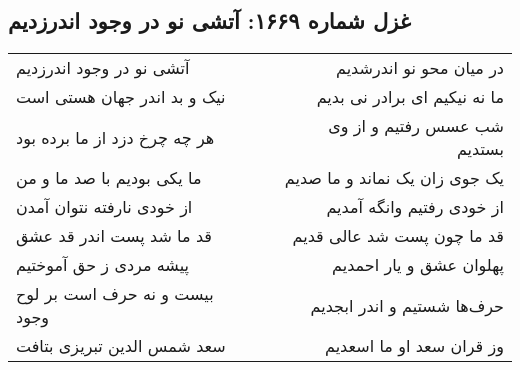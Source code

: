 \begin{center}
\section*{غزل شماره ۱۶۶۹: آتشی نو در وجود اندرزدیم}
\label{sec:1669}
\begin{longtable}{l p{0.5cm} r}
آتشی نو در وجود اندرزدیم
&&
در میان محو نو اندرشدیم
\\
نیک و بد اندر جهان هستی است
&&
ما نه نیکیم ای برادر نی بدیم
\\
هر چه چرخ دزد از ما برده بود
&&
شب عسس رفتیم و از وی بستدیم
\\
ما یکی بودیم با صد ما و من
&&
یک جوی زان یک نماند و ما صدیم
\\
از خودی نارفته نتوان آمدن
&&
از خودی رفتیم وانگه آمدیم
\\
قد ما شد پست اندر قد عشق
&&
قد ما چون پست شد عالی قدیم
\\
پیشه مردی ز حق آموختیم
&&
پهلوان عشق و یار احمدیم
\\
بیست و نه حرف است بر لوح وجود
&&
حرف‌ها شستیم و اندر ابجدیم
\\
سعد شمس الدین تبریزی بتافت
&&
وز قران سعد او ما اسعدیم
\\
\end{longtable}
\end{center}
